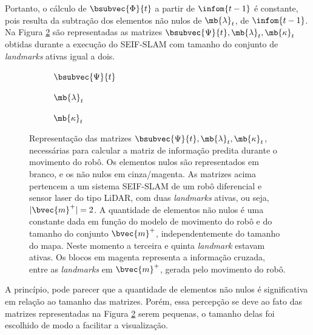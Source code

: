 Portanto, o cálculo de $\bsubvec{\Phi}{t}$ a partir de $\infom{t-1}$
é constante, pois resulta da subtração dos elementos não nulos 
de $\mb{\lambda}_t$, de $\infom{t-1}$. Na Figura 
\ref{fig:seif-slam-prediction-variables} são representadas as matrizes $\bsubvec{\Psi}{t}, \mb{\lambda}_t, \mb{\kappa}_t$ obtidas durante a 
execução do SEIF-SLAM com tamanho do conjunto de \textit{landmarks} ativas 
igual a dois. 
\begin{figure}[h]
  \begin{subfigure}{.30\textwidth}
    
    \caption{$\bsubvec{\Psi}{t}$}
  \end{subfigure}
  \hfill
  \begin{subfigure}{.30\textwidth}
    
    \caption{$\mb{\lambda}_t$}
  \end{subfigure}
  \hfill
  \begin{subfigure}{.30\textwidth}
    
    \caption{$\mb{\kappa}_{t}$}
    \label{fig:seif-slam-kappa}
  \end{subfigure}
  \caption{Representação das matrizes $\bsubvec{\Psi}{t}, \mb{\lambda}_t, \mb{\kappa}_t$, necessárias para calcular a 
  matriz de informação predita durante o movimento do robô. Os elementos 
  nulos são representados em branco, e os não nulos em cinza/magenta. 
  As matrizes acima 
  pertencem a um sistema SEIF-SLAM de um robô diferencial e 
  sensor laser do tipo LiDAR, com duas \textit{landmarks} ativas, ou seja, $\lvert \bvec{m}^+ \rvert = 2$. A quantidade de elementos não nulos 
  é uma constante dada em função do modelo de movimento do robô e do tamanho do conjunto $\bvec{m}^+$, independentemente do tamanho do mapa. Neste momento a terceira e quinta \textit{landmark} estavam ativas. 
  Os blocos em magenta representa a informação cruzada, entre as \textit{landmarks} em $\bvec{m}^+$, gerada pelo movimento do robô.}
  \label{fig:seif-slam-prediction-variables}
\end{figure}

A princípio, pode parecer que a quantidade de elementos não 
nulos é significativa em relação ao tamanho das matrizes. Porém, essa 
percepção se deve ao fato das matrizes representadas na Figura \ref{fig:seif-slam-prediction-variables} serem pequenas, o tamanho delas foi escolhido de modo a facilitar a visualização.


